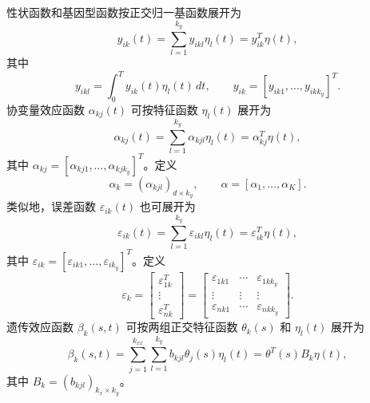 性状函数和基因型函数按正交归一基函数展开为
\begin{equation}
y_{ik}(t)=\sum_{l=1}^{k_y}y_{ikl}\eta_l(t)=y_{ik}^T\eta(t),
\tag{3.68}
\end{equation}
其中
\[
y_{ikl}=\int_0^Ty_{ik}(t)\eta_l(t)\,dt,\qquad
y_{ik}=[y_{ik1},\ldots,y_{ikk_y}]^T.
\]
协变量效应函数 $\alpha_{kj}(t)$ 可按特征函数 $\eta_l(t)$ 展开为
\begin{equation}
\alpha_{kj}(t)=\sum_{l=1}^{k_y}\alpha_{kjl}\eta_l(t)=\alpha_{kj}^T\eta(t),
\tag{3.69}
\end{equation}
其中 $\alpha_{kj}=[\alpha_{kj1},\ldots,\alpha_{kjk_y}]^T$。定义
\[
\alpha_k=(\alpha_{kjl})_{d\times k_y},\qquad
\alpha=[\alpha_1,\ldots,\alpha_K].
\]
类似地，误差函数 $\varepsilon_{ik}(t)$ 也可展开为
\begin{equation}
\varepsilon_{ik}(t)=\sum_{l=1}^{k_y}\varepsilon_{ikl}\eta_l(t)
=\varepsilon_{ik}^T\eta(t),
\tag{3.70}
\end{equation}
其中 $\varepsilon_{ik}=[\varepsilon_{ik1},\ldots,\varepsilon_{ik_y}]^T$。定义
\begin{equation}
\varepsilon_k=
\begin{bmatrix}\varepsilon_{1k}^T\\\vdots\\\varepsilon_{nk}^T\end{bmatrix}
=\begin{bmatrix}
\varepsilon_{1k1}&\cdots&\varepsilon_{1kk_y}\\
\vdots&\vdots&\vdots\\
\varepsilon_{nk1}&\cdots&\varepsilon_{nkk_y}
\end{bmatrix}.
\tag{3.71}
\end{equation}
遗传效应函数 $\beta_k(s,t)$ 可按两组正交特征函数 $\theta_k(s)$ 和 $\eta_l(t)$ 展开为
\begin{equation}
\beta_k(s,t)=\sum_{j=1}^{k_{xx}}\sum_{l=1}^{k_y}b_{kjl}\theta_j(s)\eta_l(t)
=\theta^T(s)B_k\eta(t),
\tag{3.72}
\end{equation}
其中 $B_k=(b_{kjl})_{k_x\times k_y}$。

